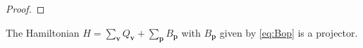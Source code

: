 \begin{proof}
\end{proof}

\begin{thm}
	The Hamiltonian $H=\sum_\mathbf{v}Q_\mathbf{v}+\sum_\mathbf{p}B_\mathbf{p}$ with $B_\mathbf{p}$ given by \cref{eq:Bop} is a projector. 
\end{thm}

